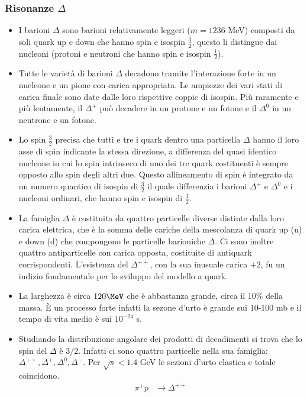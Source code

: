 \subsubsection{Risonanze $\Delta$}
\begin{itemize}
\item I barioni $\Delta$ sono barioni relativamente leggeri ($m = 1236$ MeV) composti da soli quark up e down che hanno spin e isospin $\frac32$, questo li distingue dai nucleoni (protoni e neutroni che hanno spin e isospin $\frac {1}{2}$). 
\item Tutte le varietà di barioni $\Delta$ decadono tramite l'interazione forte in un nucleone e un pione con carica appropriata. Le ampiezze dei vari stati di carica finale sono date dalle loro rispettive coppie di isospin. Più raramente e più lentamente, il $\Delta^+$ può decadere in un protone e un fotone e il $\Delta^0$ in un neutrone e un fotone. 
\item Lo spin $\frac32$ precisa che tutti e tre i quark dentro una particella $\Delta$ hanno il loro asse di spin indicante la stessa direzione, a differenza del quasi identico nucleone in cui lo spin intrinseco di uno dei tre quark costituenti è sempre opposto allo spin degli altri due. Questo allineamento di spin è integrato da un numero quantico di isospin di $\frac32$ il quale differenzia i barioni $\Delta^+$ e $\Delta^0$ e i nucleoni ordinari, che hanno spin e isospin di $\frac12$.
\item La famiglia $\Delta$ è costituita da quattro particelle diverse distinte dalla loro carica elettrica, che è la somma delle cariche della mescolanza di quark up (u) e down (d) che compongono le particelle barioniche $\Delta$. Ci sono inoltre quattro antiparticelle con carica opposta, costituite di antiquark corrispondenti. L'esistenza del $\Delta^{++}$, con la sua inusuale carica $+2$, fu un indizio fondamentale per lo sviluppo del modello a quark. 
\item La larghezza è circa $120\MeV$ che è abbastanza grande, circa il 10\% della massa. È un processo forte infatti la sezone d'urto è grande sui 10-100 mb e il tempo di vita medio è sui $10^{-24}$ s. 
\item Studiando la distribuzione angolare dei prodotti di decadimenti si trova che lo spin del $\Delta$ è $3/2$. Infatti ci sono quattro particelle nella sua famiglia: $\Delta^{++},\Delta^+,\Delta^{0},\Delta^{-}$. Per $\sqrt s<1.4$ GeV le sezioni d'urto elastica e totale coincidono. 
\begin{align*}
    \pi^+p&\to\Delta^{++}\\

\end{align*}
\end{itemize}
